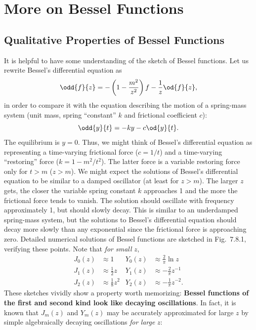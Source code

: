 \section{More on Bessel Functions}
\label{sec:7.8}

\subsection{Qualitative Properties of Bessel Functions}
\label{sec:7.8.1}

It is helpful to have some understanding of the sketch of Bessel functions.  Let us rewrite Bessel's differential equation as
\begin{equation}
\odd{f}{z} = -\left(1 - \frac{m^2}{z^2}\right)f - \frac{1}{z}\od{f}{z},
\label{eq:7.8.1}
\end{equation}
in order to compare it with the equation describing the motion of a spring-mass system (unit mass, spring ``constant'' $k$ and frictional coefficient $c$):
\[
\odd{y}{t} = -ky - c\od{y}{t}.
\]
The equilibrium is $y = 0$.  Thus, we might think of Bessel's differential equation as representing a time-varying frictional force ($c = 1/t$) and a time-varying ``restoring'' force ($k = 1 - m^2/t^2$).  The latter force is a variable restoring force only for $t > m$ ($z > m$).  We might expect the solutions of Bessel's differential equation to be similar to a damped oscillator (at least for $z > m$).  The larger $z$ gets, the closer the variable spring constant $k$ approaches 1 and the more the frictional force tends to vanish.  The solution should oscillate with frequency approximately 1, but should slowly decay.  This is similar to an underdamped spring-mass system, but the solutions to Bessel's differential equation should decay more slowly than any exponential since the frictional force is approaching zero.  Detailed numerical solutions of Bessel functions are sketched in Fig.~7.8.1, verifying these points.  Note that \emph{for small} $z$,
\begin{equation}
\begin{aligned}
J_0(z) &\approx 1 & Y_0(z) &\approx \tfrac{2}{\pi}\ln z \\
J_1(z) &\approx \tfrac{1}{2}z & Y_1(z) &\approx -\tfrac{2}{\pi}z^{-1} \\
J_2(z) &\approx \tfrac{1}{8}z^2 & Y_2(z) &\approx -\tfrac{1}{\pi}z^{-2}.
\end{aligned}
\label{eq:7.8.2}
\end{equation}
These sketches vividly show a property worth memorizing: \textbf{Bessel functions of the first and second kind look like decaying oscillations}.  In fact, it is known that $J_m(z)$ and $Y_m(z)$ may be accurately approximated for large $z$ by simple algebraically decaying oscillations \emph{for large} $z$:
